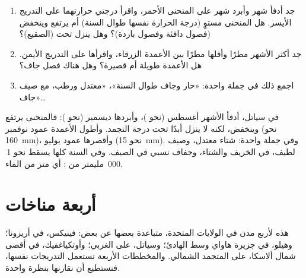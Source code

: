 \begin{method}\label{met:g5:weather-and-climate:reading}
\begin{enumerate}
  \item جد أدفأ شهر وأبرد شهر على المنحنى الأحمر، واقرأ درجتي حرارتهما
        على التدريج الأيسر. هل المنحنى مستوٍ (درجة الحرارة نفسها طوال
        السنة) أم يرتفع وينخفض (فصول دافئة وفصول باردة)؟ وهل ينزل تحت
         (الصقيع)؟
  \item جد أكثر الأشهر مطرًا وأقلها مطرًا بين الأعمدة الزرقاء، واقرأها
        على التدريج الأيمن. هل الأعمدة طويلة أم قصيرة؟ وهل هناك فصل
        جاف؟
  \item اجمع ذلك في جملة واحدة: «حار وجاف طوال السنة»، «معتدل
        ورطب، مع صيف جاف»{\ldots}
\end{enumerate}
\end{method}

\begin{example}[سياتل]\label{ex:g5:weather-and-climate:seattle}
في سياتل، أدفأ الأشهر أغسطس (نحو )، وأبردها ديسمبر
(نحو ): فالمنحنى يرتفع وينخفض، لكنه لا ينزل أبدًا تحت درجة
التجمد. وأطول الأعمدة عمود نوفمبر (نحو 160~mm)، وأقصرها عمود يوليو
(نحو 15~mm). وفي جملة واحدة: شتاء معتدل، وصيف لطيف،  في الخريف والشتاء،
وجفاف نسبي في الصيف. وفي السنة كلها يسقط نحو 1\,000~مليمتر من : أي
متر من الماء.
\end{example}

\section{أربعة مناخات}

هذه  لأربع مدن في الولايات المتحدة، متباعدة بعضها
عن بعض: فينيكس، في  أريزونا؛ وهيلو، في جزيرة هاواي وسط 
الهادئ؛ وسياتل، على  الغربي؛ وأوتكياغفيك، في أقصى شمال ألاسكا، على
  المتجمد الشمالي.
والمخططات الأربعة تستعمل التدريجات نفسها، فنستطيع أن نقارنها بنظرة واحدة.

